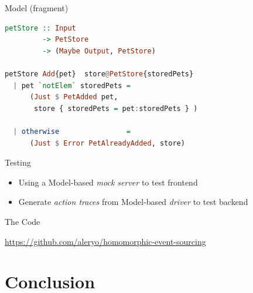 \begin{frame}[fragile]{Model (fragment)}
\begin{lstlisting}[language=Haskell,basicstyle=\ttfamily,keywordstyle=\color{red}]
petStore :: Input
         -> PetStore
         -> (Maybe Output, PetStore)

petStore Add{pet}  store@PetStore{storedPets}
  | pet `notElem` storedPets =
      (Just $ PetAdded pet, 
       store { storedPets = pet:storedPets } )
       
  | otherwise                =
      (Just $ Error PetAlreadyAdded, store)
\end{lstlisting}
\end{frame}

\begin{frame}[fragile]{Testing}
  \begin{itemize}[<+->]
  \item Using a Model-based \emph{mock server} to test frontend
  \item Generate \emph{action traces} from Model-based \emph{driver} to test backend
  \end{itemize}
\end{frame}

\begin{frame}[fragile]{The Code}
  \begin{center}
  \url{https://github.com/aleryo/homomorphic-event-sourcing}
  \end{center}
\end{frame}


\part{Conclusion}

